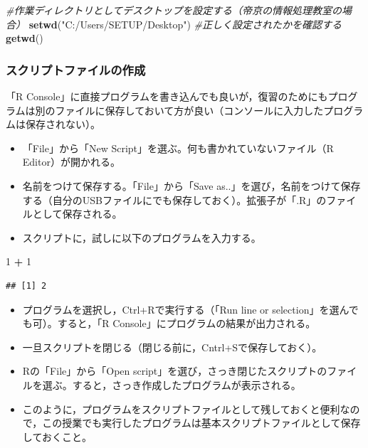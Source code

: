 \documentclass[]{article}
\newenvironment{Shaded}{\begin{snugshade}}{\end{snugshade}}
\newcommand{\KeywordTok}[1]{\textcolor[rgb]{0.13,0.29,0.53}{\textbf{#1}}}
\newcommand{\DecValTok}[1]{\textcolor[rgb]{0.00,0.00,0.81}{#1}}
\newcommand{\StringTok}[1]{\textcolor[rgb]{0.31,0.60,0.02}{#1}}
\newcommand{\CommentTok}[1]{\textcolor[rgb]{0.56,0.35,0.01}{\textit{#1}}}
\newcommand{\OperatorTok}[1]{\textcolor[rgb]{0.81,0.36,0.00}{\textbf{#1}}}
\newcommand{\NormalTok}[1]{#1}
\begin{document}
\begin{Shaded}
\begin{Highlighting}[]
\CommentTok{#作業ディレクトリとしてデスクトップを設定する（帝京の情報処理教室の場合） }
\KeywordTok{setwd}\NormalTok{(}\StringTok{"C:/Users/SETUP/Desktop"}\NormalTok{) }
\CommentTok{#正しく設定されたかを確認する}
\KeywordTok{getwd}\NormalTok{() }
\end{Highlighting}
\end{Shaded}

\subsubsection{スクリプトファイルの作成}

「R
Console」に直接プログラムを書き込んでも良いが，復習のためにもプログラムは別のファイルに保存しておいて方が良い（コンソールに入力したプログラムは保存されない）。

\begin{itemize}
\item
  「File」から「New Script」を選ぶ。何も書かれていないファイル（R
  Editor）が開かれる。\\
\item
  名前をつけて保存する。「File」から「Save
  as..」を選び，名前をつけて保存する（自分のUSBファイルにでも保存しておく）。拡張子が「.R」のファイルとして保存される。
\item
  スクリプトに，試しに以下のプログラムを入力する。
\end{itemize}

\begin{Shaded}
\begin{Highlighting}[]
\DecValTok{1} \OperatorTok{+}\StringTok{ }\DecValTok{1}
\end{Highlighting}
\end{Shaded}

\begin{verbatim}
## [1] 2
\end{verbatim}

\begin{itemize}
\item
  プログラムを選択し，Ctrl+Rで実行する（「Run line or
  selection」を選んでも可）。すると，「R
  Console」にプログラムの結果が出力される。
\item
  一旦スクリプトを閉じる（閉じる前に，Cntrl+Sで保存しておく）。\\
\item
  Rの「File」から「Open
  script」を選び，さっき閉じたスクリプトのファイルを選ぶ。すると，さっき作成したプログラムが表示される。\\
\item
  このように，プログラムをスクリプトファイルとして残しておくと便利なので，この授業でも実行したプログラムは基本スクリプトファイルとして保存しておくこと。
\end{itemize}
\end{document}
